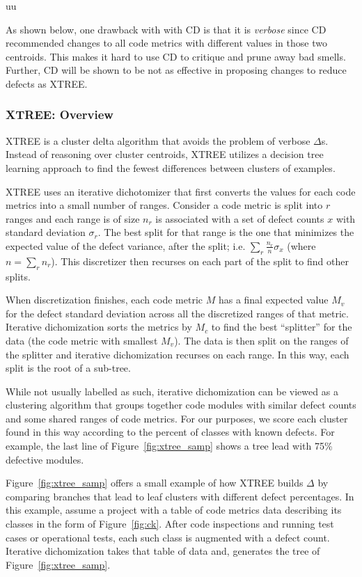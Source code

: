 uu \documentclass[final,twocolumn,5p]{elsarticle}
\newcommand{\fig}[1]{Figure~\ref{fig:#1}}
\theoremstyle{break}
\begin{document}
As shown below, one drawback with with CD is that it is {\em verbose}
since
CD   recommended changes to all code
metrics with different values in those two centroids. 
This makes it hard to use CD to   critique and prune away bad smells. Further, CD will be shown to be
not as effective
in proposing changes to reduce defects as XTREE.

\subsubsection{XTREE: Overview}

  XTREE  is a cluster delta algorithm
  that avoids the problem of verbose $\Delta$s.
  Instead of reasoning over cluster centroids,
  XTREE utilizes a decision tree learning approach
  to find the fewest differences between clusters of examples.
  
  
 XTREE uses an iterative dichotomizer that
first converts the values for each code
metrics into a small number of ranges.
Consider a code metric is split into $r$ ranges and each range is of
  size
    $n_r$ is
  associated with a set of defect counts $x$ with standard deviation
  $\sigma_r$.
  The best split for that range is
  the one that minimizes the expected value of the
  defect variance, after the split; i.e.
  $\sum_r\frac{n_r}{n}\sigma_x$ (where $n=\sum_r n_r$).
  This discretizer then recurses on each part of the split
  to find other splits. 
  
  When discretization finishes, each code metric $M$ has a 
  final expected value $M_v$ for the defect standard deviation 
  across all the discretized ranges of that metric.
  Iterative dichomization sorts the metrics by $M_c$
  to find the best ``splitter'' for the data
  (the code metric with smallest $M_v$). The data
  is then split on the ranges of the splitter and
  iterative dichomization recurses on each range.  In this way,
  each split is the root of a sub-tree.
  

 
  While not usually labelled as such, iterative dichomization can
  be viewed as a clustering algorithm that groups together code modules
  with similar defect counts and some shared ranges of code metrics.
  For our purposes, we score each cluster found in this way according
  to the percent of classes with known defects. For example,
  the last line of \fig{xtree_samp} shows a tree lead with 75\%
  defective modules.
  
 \fig{xtree_samp} offers
  a small example of how XTREE builds
    $\Delta$ by comparing branches that lead to leaf clusters
  with different defect percentages. In this example, assume a project with a table of code metrics data describing its classes in the form of \fig{ck}. After code inspections and running test cases or operational
      tests, each such class is augmented with a defect count.
      Iterative dichomization takes that table of data and, 
        generates the tree of \fig{xtree_samp}.
        
\end{document}
